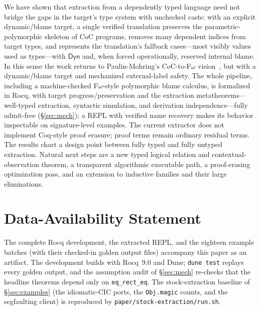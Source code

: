 \documentclass[acmsmall,anonymous=false,nonacm]{acmart}
\newcommand{\dyn}{\ensuremath{\mathsf{Dyn}}}
\begin{document}
We have shown that extraction from a dependently typed language need not
bridge the gaps in the target's type system with unchecked casts: with an
explicit dynamic/blame target, a single verified translation preserves
the parametric-polymorphic skeleton of CoC programs, removes many dependent
indices from target types, and represents the translation's fallback cases---most visibly values used as
types---with $\dyn$ and, when forced operationally, reserved internal blame.  In this sense the work returns to Paulin-Mohring's
CoC-to-F$\omega$ vision~\cite{paulinmohring1989fomega}, but with a dynamic/blame
target and mechanized external-label safety.  The whole pipeline, including a
machine-checked F$\omega$-style polymorphic blame calculus, is formalized in
Rocq, with target progress/preservation and the extraction metatheorems---well-typed
extraction, syntactic simulation, and derivation independence---fully admit-free
(\S\ref{sec:mech}); a REPL with verified name
recovery makes its behavior
inspectable on signature-level examples. The current extractor does not implement Coq-style proof
erasure; proof terms remain ordinary residual terms. The results chart a design
point between fully typed and fully untyped extraction. Natural next steps are a
new typed logical relation and contextual-observation theorem, a transparent
algorithmic executable path, a proof-erasing optimization pass, and an
extension to inductive families and their large eliminations.

\section*{Data-Availability Statement}
The complete Rocq development, the extracted REPL, and the eighteen example
batches (with their checked-in golden output files) accompany this paper as an
artifact. The development builds with Rocq~9.0 and Dune; \texttt{dune test}
replays every golden output, and the assumption audit of \S\ref{sec:mech}
re-checks that the headline theorems depend only on \texttt{eq\_rect\_eq}.
The stock-extraction baseline of \S\ref{sec:examples} (the idiomatic-CIC
ports, the \texttt{Obj.magic} counts, and the segfaulting client) is
reproduced by \texttt{paper/stock-extraction/run.sh}.



\end{document}
